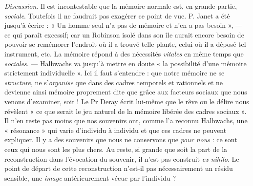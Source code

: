{\it Discussion}. Il est incontestable que la mémoire normale est, en
grande partie, {\it sociale}. Toutefois il ne faudrait pas exagérer ce point
de vue. P. Janet a été jusqu’à écrire : « Un homme seul n’a pas de
mémoire et n’en a pas besoin », — ce qui paraît excessif; car un
Robinson isolé dans son île aurait encore besoin de pouvoir se remémorer
l'endroit où il a trouvé telle plante, celui où il a déposé tel
instrument, etc. La mémoire répond à des nécessités {\it vitales} en même
temps que {\it sociales}. — Halbwachs va jusqu’à mettre en doute « la
possibilité d’une mémoire strictement individuelle ». Ici il faut s’entendre :
que notre mémoire ne se {\it structure}, ne s'{\it organise} que dans des
cadres temporels et rationnels et ne devienne ainsi mémoire proprement
dite que grâce aux facteurs sociaux que nous venons d’examiner,
soit ! Le Pr Deray écrit lui-même que le rêve ou le délire nous
révèlent « ce que serait le jeu naturel de la mémoire libérée des cadres
sociaux ». Il n’en reste pas moins que nos souvenirs ont, comme l’a
reconnu Halbwachs, une « résonance » qui varie d’individu à individu
et que ces cadres ne peuvent expliquer. Il y a des souvenirs que nous
ne conservons que {\it pour nous} : ce sont ceux qui nous sont les plus chers.
Au reste, si grande que soit la part de la reconstruction dans l’évocation
du souvenir, il n’est pas construit {\it ex nihilo}. Le point de départ
de cette reconstruction n’est-il pas nécessairement un résidu sensible,
une {\it image} antérieurement vécue par l'individu ?


